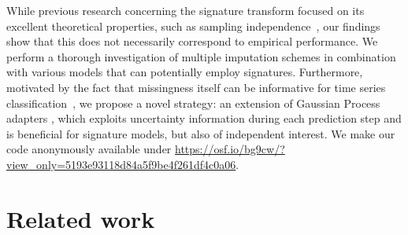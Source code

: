 \documentclass{article}
\begin{document}
While previous research concerning the signature transform
focused on its excellent theoretical properties, such as sampling
independence~\citep[Proposition A.7]{kidger2019deep}, our findings show
that this does not
necessarily correspond to empirical performance.
%
We perform a thorough investigation of multiple imputation schemes in combination with various models that can potentially employ signatures.
Furthermore, motivated by the fact that missingness itself can be
informative for time series classification~\citep{rubin1976inference}, we propose a novel strategy: an extension of Gaussian Process adapters \citep{li2016scalable, futoma2017mgp}, which exploits uncertainty information during each prediction step and is beneficial for signature models, but also of independent interest.
%
%
%
We make our code anonymously available under \url{https://osf.io/bg9cw/?view_only=5193e93118d84a5f9be4f261df4c0a06}.

\section{Related work} %
\end{document}
